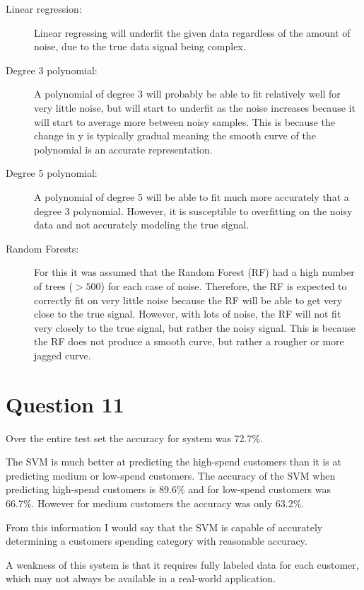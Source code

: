 \documentclass[12pt,notitlepage]{article}
\newcommand{\question}{\section*}
\begin{document}
\begin{description}

    \item[Linear regression:] Linear regressing will underfit the given data
        regardless of the amount of noise, due to the true data signal being
        complex.

    \item[Degree 3 polynomial:] A polynomial of degree 3 will probably be able to
        fit relatively well for very little noise, but will start to underfit as
        the noise increases because it will start to average more between noisy
        samples. This is because the change in y is typically gradual meaning
        the smooth curve of the polynomial is an accurate representation.

    \item[Degree 5 polynomial:] A polynomial of degree 5 will be able to fit
        much more accurately that a degree 3 polynomial. However, it is
        susceptible to overfitting on the noisy data and not accurately modeling
        the true signal.

    \item[Random Forests:] For this it was assumed that the Random Forest (RF) had a
        high number of trees ($> 500$) for each case of noise. Therefore, the RF
        is expected to correctly fit on very little noise because the RF will be able
        to get very close to the true signal. However, with lots of noise, the
        RF will not fit very closely to the true signal, but rather the noisy
        signal. This is because the RF does not produce a smooth curve, but
        rather a rougher or more jagged curve.

\end{description}

\question{Question 11}

Over the entire test set the accuracy for system was 72.7\%.

The SVM is much better at predicting the high-spend customers than
it is at predicting medium or low-spend customers. The accuracy of the SVM when
predicting high-spend customers is 89.6\% and for low-spend customers was
66.7\%. However for medium customers the accuracy was only 63.2\%.

From this information I would say that the SVM is capable of accurately
determining a customers spending category with reasonable accuracy.

A weakness of this system is that it requires fully labeled data for each
customer, which may not always be available in a real-world application. 
\end{document}
